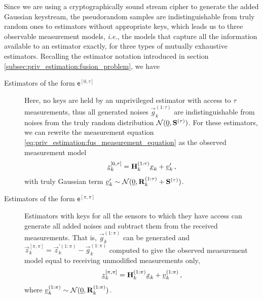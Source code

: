 Since we are using a cryptographically sound stream cipher to generate the added Gaussian keystream, the pseudorandom samples are indistinguishable from truly random ones to estimators without appropriate keys, which leads us to three observable measurement models, \textit{i.e.}, the models that capture all the information available to an estimator exactly, for three types of mutually exhaustive estimators. Recalling the estimator notation introduced in section \ref{subsec:priv_estimation:fusion_problem}, we have
\begin{description}
    \item[Estimators of the form $\mathsf{e}^{[0,\tau]}$] Here, no keys are held by an unprivileged estimator with access to $\tau$ measurements, thus all generated noises $\vec{g}_k^{(1:\tau)}$ are indistinguishable from noises from the truly random distribution $\mathcal{N}({\underline{0}}, {{\mathbf{S}}}^{(\tau)})$. For these estimators, we can rewrite the measurement equation \eqref{eq:priv_estimation:fus_measurement_equation} as the observed measurement model
    \begin{equation}\label{eq:priv_estimation:fus_0q_obs_measurement_model}
        {\underline{z}}_k^{[0,\tau]} = {{\mathbf{H}}}_k^{(1:\tau)}{\underline{x}}_k + {\underline{v}}_k^{\prime}\,,
    \end{equation}
    with truly Gaussian term ${\underline{v}}_k^{\prime} \sim \mathcal{N}({\underline{0}}, {{\mathbf{R}}}_k^{(1:\tau)}+{{\mathbf{S}}}^{(\tau)})$.
  
    \item[Estimators of the form $\mathsf{e}^{[\pi,\pi]}$] Estimators with keys for all the sensors to which they have access can generate all added noises and subtract them from the received measurements. That is, $\vec{g}_k^{(1:\pi)}$ can be generated and $\vec{z}_k^{[\pi,\pi]}=\vec{z}_k^{\prime(1:\pi)}-\vec{g}_k^{(1:\pi)}$ computed to give the observed measurement model equal to receiving unmodified measurements only,
    \begin{equation}\label{eq:priv_estimation:fus_pp_obs_measurement_model}
        {\underline{z}}_k^{[\pi,\pi]} = {{\mathbf{H}}}_k^{(1:\pi)}{\underline{x}}_k + {\underline{v}}_k^{(1:\pi)}\,,
    \end{equation}
    where ${\underline{v}}_k^{(1:\pi)} \sim \mathcal{N}({\underline{0}}, {{\mathbf{R}}}_k^{(1:\pi)})$.


\end{description}
